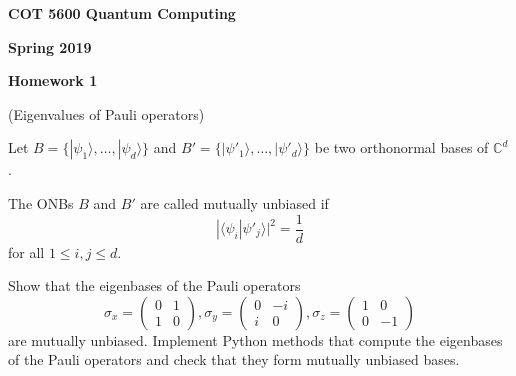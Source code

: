 \documentclass[12pt]{article}
\renewcommand{\>}{\rangle}
\newcommand{\<}{\langle}
\newcommand{\C}{\mathbb{C}}
\begin{document}
\begin{center}
{\bf COT 5600 Quantum Computing}

\medskip
{\bf Spring 2019}

\bigskip

{\bf Homework 1}
\end{center}

\newpage


 (Eigenvalues of Pauli operators)

\medskip
\noindent
Let $B=\{|\psi_1\>,\ldots,|\psi_d\>\}$ and $B'=\{|\psi'_1\>,\ldots,|\psi'_d\>\}$ be two orthonormal bases of $\C^d$.

The ONBs $B$ and $B'$ are called mutually unbiased if
\[
|\< \psi_i | \psi'_j \>|^2 = \frac{1}{d}
\]
for all $1\le i,j \le d$.

Show that the eigenbases of the Pauli operators
\[
\sigma_x =
\left(
\begin{array}{cc}
0 & 1 \\
1 & 0
\end{array}
\right),
%
\sigma_y =
\left(
\begin{array}{cc}
0 & -i \\
i & 0
\end{array}
\right),
%
\sigma_z =
\left(
\begin{array}{cc}
1 & 0 \\
0 & -1
\end{array}
\right)
\]
are mutually unbiased. Implement Python methods that compute the eigenbases of the Pauli operators and check that they form mutually unbiased bases.
\medskip\\
\end{document}
